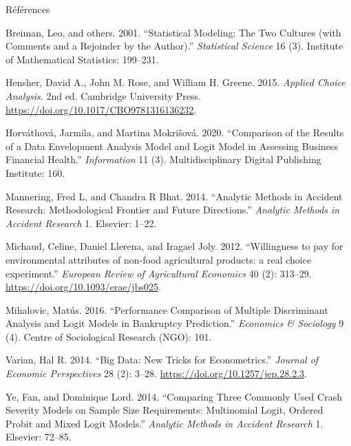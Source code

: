 \documentclass[11pt,ignorenonframetext,]{beamer}
\begin{document}
\begin{frame}{Références}
\protect\hypertarget{references}{}

\tiny

\hypertarget{refs}{}
\leavevmode\hypertarget{ref-breiman2001stat}{}%
Breiman, Leo, and others. 2001. ``Statistical Modeling: The Two Cultures
(with Comments and a Rejoinder by the Author).'' \emph{Statistical
Science} 16 (3). Institute of Mathematical Statistics: 199--231.

\leavevmode\hypertarget{ref-hensher2015}{}%
Hensher, David A., John M. Rose, and William H. Greene. 2015.
\emph{Applied Choice Analysis}. 2nd ed. Cambridge University Press.
\url{https://doi.org/10.1017/CBO9781316136232}.

\leavevmode\hypertarget{ref-horvathova2020comparison}{}%
Horváthová, Jarmila, and Martina Mokrišová. 2020. ``Comparison of the
Results of a Data Envelopment Analysis Model and Logit Model in
Assessing Business Financial Health.'' \emph{Information} 11 (3).
Multidisciplinary Digital Publishing Institute: 160.

\leavevmode\hypertarget{ref-mannering2014analytic}{}%
Mannering, Fred L, and Chandra R Bhat. 2014. ``Analytic Methods in
Accident Research: Methodological Frontier and Future Directions.''
\emph{Analytic Methods in Accident Research} 1. Elsevier: 1--22.

\leavevmode\hypertarget{ref-llerena2013rose}{}%
Michaud, Celine, Daniel Llerena, and Iragael Joly. 2012. ``Willingness
to pay for environmental attributes of non-food agricultural products: a
real choice experiment.'' \emph{European Review of Agricultural
Economics} 40 (2): 313--29. \url{https://doi.org/10.1093/erae/jbs025}.

\leavevmode\hypertarget{ref-mihalovic2016performance}{}%
Mihalovic, Matús. 2016. ``Performance Comparison of Multiple
Discriminant Analysis and Logit Models in Bankruptcy Prediction.''
\emph{Economics \& Sociology} 9 (4). Centre of Sociological Research
(NGO): 101.

\leavevmode\hypertarget{ref-varian2014bd}{}%
Varian, Hal R. 2014. ``Big Data: New Tricks for Econometrics.''
\emph{Journal of Economic Perspectives} 28 (2): 3--28.
\url{https://doi.org/10.1257/jep.28.2.3}.

\leavevmode\hypertarget{ref-ye2014comparing}{}%
Ye, Fan, and Dominique Lord. 2014. ``Comparing Three Commonly Used Crash
Severity Models on Sample Size Requirements: Multinomial Logit, Ordered
Probit and Mixed Logit Models.'' \emph{Analytic Methods in Accident
Research} 1. Elsevier: 72--85.

\normalsize

\end{frame}
\end{document}
